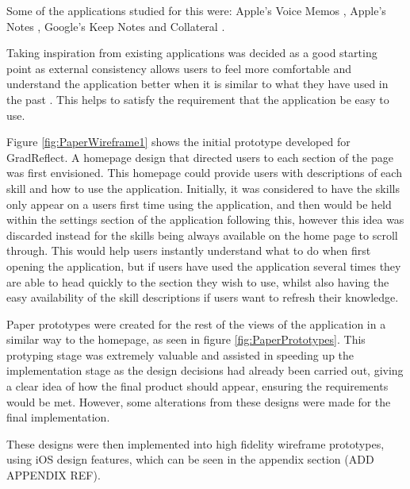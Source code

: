 \documentclass{l4proj}
\begin{document}
Some of the applications studied for this were: Apple's Voice Memos \citep{apple_inc_voice_2021}, Apple's Notes \citep{apple_inc_notes_2021}, Google's Keep Notes \citep{google_llc_google_2021} and Collateral \citep{vargas_collateral_2021}.

Taking inspiration from existing applications was decided as a good starting point as external consistency allows users to feel more comfortable and understand the application better when it is similar to what they have used in the past \citep{schlatter_visual_2013}. This helps to satisfy the requirement that the application be easy to use. 

Figure \ref{fig:PaperWireframe1} shows the initial prototype developed for GradReflect. A homepage design that directed users to each section of the page was first envisioned. This homepage could provide users with descriptions of each skill and how to use the application. Initially, it was considered to have the skills only appear on a users first time using the application, and then would be held within the settings section of the application following this, however this idea was discarded instead for the skills being always available on the home page to scroll through. This would help users instantly understand what to do when first opening the application, but if users have used the application several times they are able to head quickly to the section they wish to use, whilst also having the easy availability of the skill descriptions if users want to refresh their knowledge. 

Paper prototypes were created for the rest of the views of the application in a similar way to the homepage, as seen in figure \ref{fig:PaperPrototypes}. This protyping stage was extremely valuable and assisted in speeding up the implementation stage as the design decisions had already been carried out, giving a clear idea of how the final product should appear, ensuring the requirements would be met. However, some alterations from these designs were made for the final implementation.

These designs were then implemented into high fidelity wireframe prototypes, using iOS design features, which can be seen in the appendix section (ADD APPENDIX REF).
\end{document}

